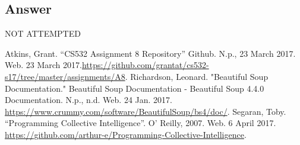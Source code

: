 \documentclass[letterpaper,11pt]{article}
\begin{document}
\subsection*{Answer}

\begin{center}
\Huge{NOT ATTEMPTED}
\end{center}


\clearpage



\begin{thebibliography}{9}
Atkins, Grant. ``CS532 Assignment 8 Repository'' Github. N.p., 23 March 2017. Web. 23 March 2017.\url{https://github.com/grantat/cs532-s17/tree/master/assignments/A8}.
Richardson, Leonard. "Beautiful Soup Documentation." Beautiful Soup Documentation - Beautiful Soup 4.4.0 Documentation. N.p., n.d. Web. 24 Jan. 2017. \url{https://www.crummy.com/software/BeautifulSoup/bs4/doc/}.
Segaran, Toby. ``Programming Collective Intelligence''. O' Reilly, 2007. Web. 6 April 2017. \url{https://github.com/arthur-e/Programming-Collective-Intelligence}.
\end{thebibliography}
\end{document}
